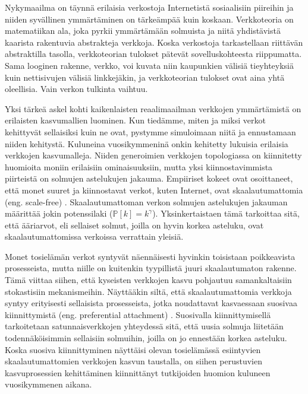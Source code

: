 \documentclass[finnish, 12pt, a4paper, sci, utf8, pdfa]{aaltothesis}
\newcommand*{\prob}{\mathbb{P}}
\begin{document}
Nykymaailma on täynnä erilaisia verkostoja Internetistä sosiaalisiin piireihin ja niiden syvällinen ymmärtäminen on tärkeämpää kuin koskaan. Verkkoteoria on matematiikan ala, 
joka pyrkii ymmärtämään solmuista ja niitä yhdistävistä kaarista rakentuvia abstrakteja verkkoja. Koska verkostoja tarkastellaan riittävän abstraktilla tasolla, verkkoteorian 
tulokset pätevät sovelluskohteesta riippumatta. Sama looginen rakenne, verkko, voi kuvata niin kaupunkien välisiä tieyhteyksiä kuin nettisivujen 
välisiä linkkejäkin, ja verkkoteorian tulokset ovat aina yhtä oleellisia. Vain verkon tulkinta vaihtuu. 

Yksi tärkeä askel kohti kaikenlaisten reaalimaailman verkkojen ymmärtämistä on erilaisten kasvumallien luominen. Kun tiedämme, miten ja miksi verkot kehittyvät sellaisiksi kuin ne ovat,
pystymme simuloimaan niitä ja ennustamaan niiden kehitystä. Kuluneina vuosikymmeninä onkin kehitetty lukuisia erilaisia verkkojen kasvumalleja. Niiden generoimien verkkojen
topologiassa on kiinnitetty huomioita moniin erilaisiin ominaisuuksiin, mutta yksi kiinnostavimmista piirteistä on solmujen astelukujen jakauma. Empiiriset kokeet ovat osoittaneet, 
että monet suuret ja kiinnostavat verkot, kuten Internet, ovat skaalautumattomia (eng. scale-free) \cite{Clauset}. Skaalautumattoman verkon solmujen astelukujen jakauman määrittää jokin 
potenssilaki ($ \prob \left[ k \right] = k^{\gamma} $). Yksinkertaistaen tämä tarkoittaa sitä, että ääriarvot, eli sellaiset solmut, joilla on hyvin korkea asteluku, ovat 
skaalautumattomissa verkoissa verrattain yleisiä. \cite{Babarasi-kirja} 

Monet tosielämän verkot syntyvät näennäisesti hyvinkin toisistaan poikkeavista prosesseista, mutta niille on kuitenkin tyypillistä juuri skaalautumaton rakenne. Tämä viittaa siihen,
että kyseisten verkkojen kasvu pohjautuu samankaltaisiin stokastisiin mekanismeihin. Näyttääkin siltä, että skaalautumattomia verkkoja syntyy erityisesti sellaisista prosesseista, 
jotka noudattavat kasvaessaan suosivaa kiinnittymistä (eng. preferential attachment) \cite{Babarasi}. Suosivalla kiinnittymisellä tarkoitetaan satunnaisverkkojen yhteydessä sitä, että uusia 
solmuja liitetään todennäköisimmin sellaisiin solmuihin, joilla on jo ennestään korkea asteluku. Koska suosiva kiinnittyminen näyttäisi olevan tosielämässä esiintyvien skaalautumattomien
verkkojen kasvun taustalla, on siihen perustuvien kasvuprosessien kehittäminen kiinnittänyt tutkijoiden huomion kuluneen vuosikymmenen aikana. 
\end{document}
